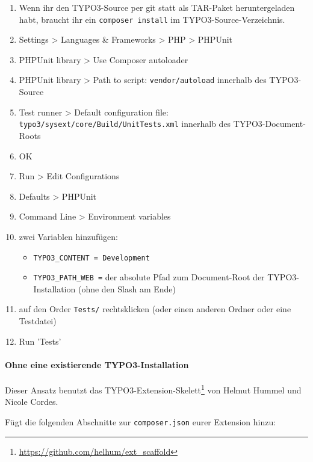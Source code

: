 \documentclass[a4paper,10pt,headsepline]{scrartcl}
\begin{document}
\begin{enumerate}
  \item Wenn ihr den TYPO3-Source per git statt als TAR-Paket heruntergeladen habt, braucht ihr ein \texttt{composer install} im TYPO3-Source-Verzeichnis.
  \item Settings > Languages \& Frameworks > PHP > PHPUnit
  \item PHPUnit library > Use Composer autoloader
  \item PHPUnit library > Path to script: \texttt{vendor/autoload} innerhalb des TYPO3-Source
  \item Test runner > Default configuration file: \texttt{typo3/sysext/core/Build/UnitTests.xml} innerhalb des TYPO3-Document-Roots
  \item OK
  \item Run > Edit Configurations
  \item Defaults > PHPUnit
  \item Command Line > Environment variables
  \item zwei Variablen hinzufügen:
    \begin{itemize}
      \item \texttt{TYPO3\_CONTENT = Development}
      \item \texttt{TYPO3\_PATH\_WEB =} der absolute Pfad zum Document-Root der TYPO3-Installation (ohne den Slash am Ende)
    \end{itemize}
  \item auf den Order \texttt{Tests/} rechtsklicken (oder einen anderen Ordner oder eine Testdatei)
  \item Run 'Tests'
\end{enumerate}


\paragraph{Ohne eine existierende TYPO3-Installation}

Dieser Ansatz benutzt das TYPO3-Extension-Skelett\footnote{\url{https://github.com/helhum/ext_scaffold}} von Helmut Hummel und Nicole Cordes.

Fügt die folgenden Abschnitte zur \texttt{composer.json} eurer Extension hinzu:

\small
{}
\normalsize
\end{document}
